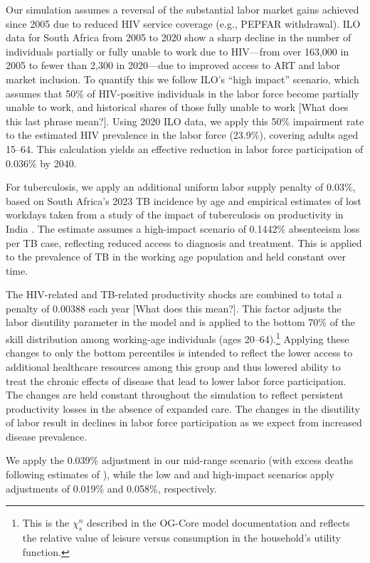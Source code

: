 \documentclass[letterpaper,12pt]{article}
\theoremstyle{definition}
\begin{document}
\begin{spacing}{1.5}
Our simulation assumes a reversal of the substantial labor market gains achieved since 2005 due to reduced HIV service coverage (e.g., PEPFAR withdrawal). ILO data for South Africa from 2005 to 2020 show a sharp decline in the number of individuals partially or fully unable to work due to HIV—from over 163,000 in 2005 to fewer than 2,300 in 2020—due to improved access to ART and labor market inclusion. To quantify this we follow ILO's ``high impact'' scenario, which assumes that 50\% of HIV-positive individuals in the labor force become partially unable to work, and historical shares of those fully unable to work [What does this last phrase mean?]. Using 2020 ILO data, we apply this 50\% impairment rate to the estimated HIV prevalence in the labor force (23.9\%), covering adults aged 15–64. This calculation yields an effective reduction in labor force participation of 0.036\% by 2040.

For tuberculosis, we apply an additional uniform labor supply penalty of 0.03\%, based on South Africa's 2023 TB incidence by age and empirical estimates of lost workdays taken from a study of the impact of tuberculosis on productivity in India \citep{Keogh2024}. The estimate assumes a high-impact scenario of 0.1442\% absenteeism loss per TB case, reflecting reduced access to diagnosis and treatment. This is applied to the prevalence of TB in the working age population and held constant over time.

The HIV-related and TB-related productivity shocks are combined to total a penalty of 0.00388 each year [What does this mean?]. This factor adjusts the labor disutility parameter in the model and is applied to the bottom 70\% of the skill distribution among working-age individuals (ages 20–64).\footnote{This is the $\chi^n_s$ described in the OG-Core model documentation and reflects the relative value of leisure versus consumption in the household's utility function.} Applying these changes to only the bottom percentiles is intended to reflect the lower access to additional healthcare resources among this group and thus lowered ability to treat the chronic effects of disease that lead to lower labor force participation.  The changes are held constant throughout the simulation to reflect persistent productivity losses in the absence of expanded care.  The changes in the disutility of labor result in declines in labor force participation as we expect from increased disease prevalence.

We apply the 0.039\% adjustment in our mid-range scenario (with excess deaths following estimates of \citet{Gandhi2025}), while the low and and high-impact scenarios apply adjustments of 0.019\% and 0.058\%, respectively.


\end{spacing}
\end{document}
